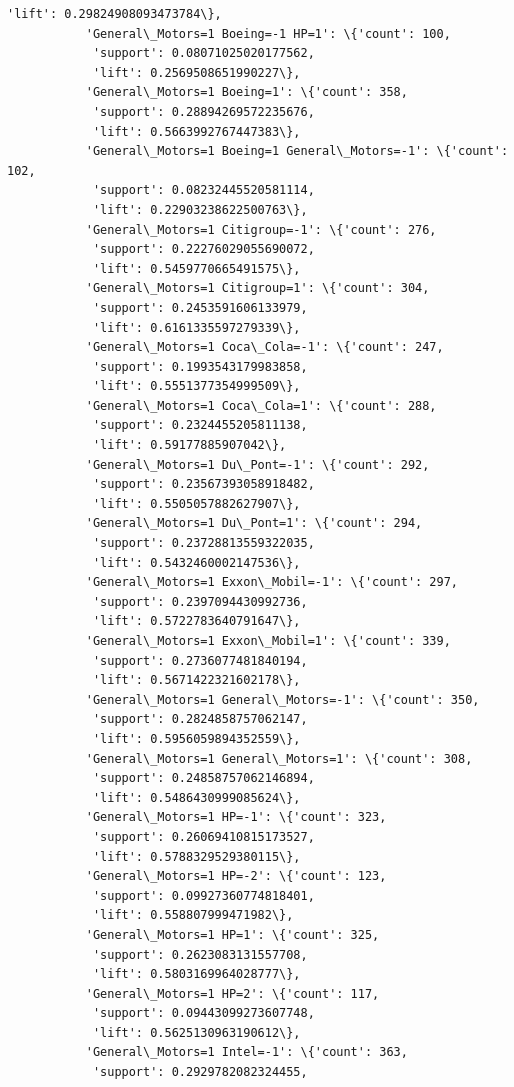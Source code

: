 \documentclass[11pt]{article}
\begin{document}
\begin{Verbatim}[commandchars=\\\{\}]
            'lift': 0.29824908093473784\},
           'General\_Motors=1 Boeing=-1 HP=1': \{'count': 100,
            'support': 0.08071025020177562,
            'lift': 0.2569508651990227\},
           'General\_Motors=1 Boeing=1': \{'count': 358,
            'support': 0.28894269572235676,
            'lift': 0.5663992767447383\},
           'General\_Motors=1 Boeing=1 General\_Motors=-1': \{'count': 102,
            'support': 0.08232445520581114,
            'lift': 0.22903238622500763\},
           'General\_Motors=1 Citigroup=-1': \{'count': 276,
            'support': 0.22276029055690072,
            'lift': 0.5459770665491575\},
           'General\_Motors=1 Citigroup=1': \{'count': 304,
            'support': 0.2453591606133979,
            'lift': 0.6161335597279339\},
           'General\_Motors=1 Coca\_Cola=-1': \{'count': 247,
            'support': 0.1993543179983858,
            'lift': 0.5551377354999509\},
           'General\_Motors=1 Coca\_Cola=1': \{'count': 288,
            'support': 0.2324455205811138,
            'lift': 0.59177885907042\},
           'General\_Motors=1 Du\_Pont=-1': \{'count': 292,
            'support': 0.23567393058918482,
            'lift': 0.5505057882627907\},
           'General\_Motors=1 Du\_Pont=1': \{'count': 294,
            'support': 0.23728813559322035,
            'lift': 0.5432460002147536\},
           'General\_Motors=1 Exxon\_Mobil=-1': \{'count': 297,
            'support': 0.2397094430992736,
            'lift': 0.5722783640791647\},
           'General\_Motors=1 Exxon\_Mobil=1': \{'count': 339,
            'support': 0.2736077481840194,
            'lift': 0.5671422321602178\},
           'General\_Motors=1 General\_Motors=-1': \{'count': 350,
            'support': 0.2824858757062147,
            'lift': 0.5956059894352559\},
           'General\_Motors=1 General\_Motors=1': \{'count': 308,
            'support': 0.24858757062146894,
            'lift': 0.5486430999085624\},
           'General\_Motors=1 HP=-1': \{'count': 323,
            'support': 0.26069410815173527,
            'lift': 0.5788329529380115\},
           'General\_Motors=1 HP=-2': \{'count': 123,
            'support': 0.09927360774818401,
            'lift': 0.558807999471982\},
           'General\_Motors=1 HP=1': \{'count': 325,
            'support': 0.2623083131557708,
            'lift': 0.5803169964028777\},
           'General\_Motors=1 HP=2': \{'count': 117,
            'support': 0.09443099273607748,
            'lift': 0.5625130963190612\},
           'General\_Motors=1 Intel=-1': \{'count': 363,
            'support': 0.2929782082324455,

\end{Verbatim}
\end{document}
